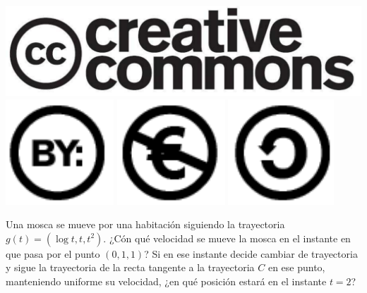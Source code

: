 \documentclass[aspectratio=149,10pt,xcolor=dvipsnames,t]{beamer}
\begin{document}
\begin{frame}[c]
\begin{center}
\biskip
\includegraphics[scale=0.07]{img/cc-logo}
\includegraphics[scale=0.2]{img/cc-by}
\includegraphics[scale=0.2]{img/cc-e}
\includegraphics[scale=0.2]{img/cc-c}
\end{center}
\end{frame}

\begin{frame}[c]
\Large
Una mosca se mueve por una habitación siguiendo la trayectoria $g(t)=(\log t, t, t^2)$. ¿Cón qué
velocidad se mueve la mosca en el instante en que pasa por el punto $(0,1,1)$? Si en ese instante decide cambiar de
trayectoria y sigue la trayectoria de la recta tangente a la trayectoria $C$ en ese punto, manteniendo uniforme su
velocidad, ¿en qué posición estará en el instante $t=2$?
\end{frame}
\end{document}
